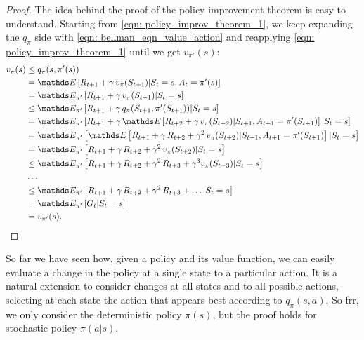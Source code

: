 \documentclass[11pt]{article}
\begin{document}
\begin{proof}
The idea behind the proof of the policy improvement theorem is easy to understand. Starting from \eqref{eqn: policy_improv_theorem_1}, we keep expanding the $q_{\pi}$ side with \eqref{eqn: bellman_eqn_value_action}  and reapplying \eqref{eqn: policy_improv_theorem_1} until we get $v_{\pi'}(s)$:
\begin{align*}
v_{\pi}(s) &\le  q_{\pi}(s, \pi'(s)) \\
&=  \E{}{R_{t+1} + \gamma\,v_{\pi}(S_{t+1}) | S_{t}=s, A_{t}=\pi'(s)} \\
&=  \E{\pi'}{R_{t+1} + \gamma\,v_{\pi}(S_{t+1}) | S_{t}=s} \\
&\le  \E{\pi'}{R_{t+1} + \gamma\,q_{\pi}(S_{t+1}, \pi'(S_{t+1})) | S_{t}=s} \\
&=  \E{\pi'}{R_{t+1} + \gamma\, \E{}{R_{t+2} + \gamma\,v_{\pi}(S_{t+2}) | S_{t+1}, A_{t+1}=\pi'(S_{t+1})} | S_{t}=s} \\
&=  \E{\pi'}{\E{}{R_{t+1} + \gamma\,R_{t+2} + \gamma^{2}\,v_{\pi}(S_{t+2}) | S_{t+1}, A_{t+1}=\pi'(S_{t+1})} | S_{t}=s} \\
&=  \E{\pi'}{R_{t+1} + \gamma\,R_{t+2} + \gamma^{2}\,v_{\pi}(S_{t+2}) | S_{t}=s} \\
&\le \E{\pi'}{R_{t+1} + \gamma\,R_{t+2} + \gamma^{2}\,R_{t+3} + \gamma^{3} v_{\pi}(S_{t+3}) | S_{t}=s} \\
&\ldots \\
&\le \E{\pi'}{R_{t+1} + \gamma\,R_{t+2} + \gamma^{2}\,R_{t+3} + \ldots | S_{t}=s} \\
&= \E{\pi'}{G_{t} | S_{t}=s} \\
&= v_{\pi'}(s).
\end{align*} \QEDB
\end{proof}
So far we have seen how, given a policy and its value function, we can easily evaluate a change in the policy at a single state to a particular action. It is a natural extension to consider changes at all states and to all possible actions, selecting at each state the action that appears best according to $q_{\pi}(s, a)$. So frr, we only consider the deterministic policy $\pi(s)$, but the proof holds for stochastic policy $\pi(a|s)$.
\end{document}
